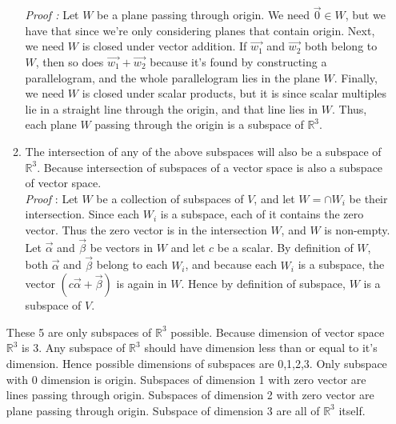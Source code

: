 \documentclass[journal,12pt,twocolumn]{IEEEtran}
\begin{document}
\begin{enumerate}[label=\alph*.]
\begin{enumerate}[label=\arabic*.]
\textit{Proof : }
Let $W$ be a plane passing through origin. We need $\vec{0} \in  W$, but we have that since we’re only considering planes that contain origin. Next, we need $W$ is closed under vector addition. If $\vec{w_1}$ and $\vec{w_2}$ both belong to $W$, then so does $\vec{w_1} + \vec{w_2}$ because it’s found by constructing a parallelogram, and the whole parallelogram lies in the plane $W$. Finally, we need $W$ is closed under
scalar products, but it is since scalar multiples lie in a straight line through the origin, and that line lies in $W$. Thus, each plane $W$ passing through the origin is a subspace of $\mathbb{R}^3$.\\
\item
The intersection of any of the above subspaces will also be a subspace of $\mathbb{R}^3$. Because intersection of subspaces of a vector space is also a subspace of vector space.\\
\textit{Proof} :
Let $W$ be a collection of subspaces of $V$, and let $W = \cap W_i$ be their intersection. Since each $W_i$ is a subspace, each of it contains the zero vector. Thus the zero vector is in the intersection $W$, and $W$ is non-empty. Let $\vec{\alpha}$ and $\vec{\beta}$ be vectors in $W$ and let $c$ be a scalar. By definition of $W$, both $\vec{\alpha}$ and $\vec{\beta}$ belong to each $W_i$, and because each $W_i$ is a subspace, the vector $(c\vec{\alpha} + \vec{\beta})$ is again in $W$. Hence by definition of subspace, $W$ is a subspace of $V$.
\\
\end{enumerate}
These 5 are only subspaces of $\mathbb{R}^3$ possible. Because dimension of vector space $\mathbb{R}^3$ is 3. Any subspace of $\mathbb{R}^3$ should have dimension less than or equal to it's dimension. Hence possible dimensions of subspaces are {0,1,2,3}. Only subspace with 0 dimension is origin. Subspaces of dimension 1 with zero vector are lines passing through origin. Subspaces of dimension 2 with zero vector are plane passing through origin. Subspace of dimension 3 are all of $\mathbb{R}^3$ itself.
\end{enumerate}
\end{document}
